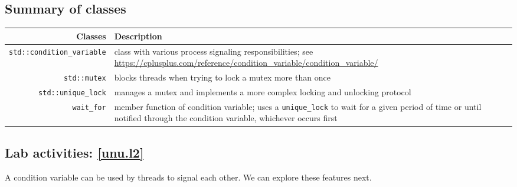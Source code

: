 \documentclass[12pt]{book}
\begin{document}
\subsection{Summary of classes}

\begin{tabularx}{\textwidth}{r  X}
  Classes & Description \\ \midrule
  \lstinline$std::condition_variable$ & class with various process signaling responsibilities; see \url{https://cplusplus.com/reference/condition_variable/condition_variable/} \\
  \lstinline$std::mutex$ & blocks threads  when trying to lock a mutex more than once\\
  \lstinline$std::unique_lock$ & manages a mutex and implements a more complex locking and unlocking protocol \\
  \lstinline$wait_for$ & member function of condition variable; uses a \lstinline$unique_lock$ to wait for a given period of time or until notified through the condition variable, whichever occurs first
\end{tabularx}


\subsection{Lab activities: \ref{unu.l2}}

A condition variable can be used by threads to signal each other. We can explore these features next.
\end{document}
